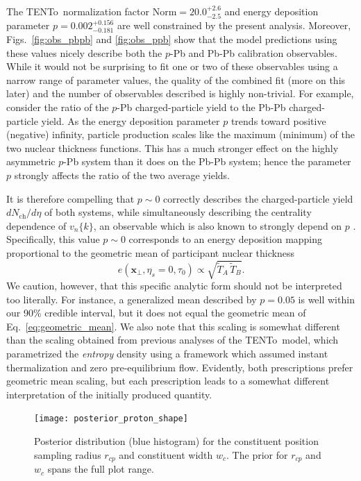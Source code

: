 \documentclass[aps,prc,reprint,amsmath,nofootinbib]{revtex4-1}
\newcommand{\trento}{T\raisebox{-0.5ex}{R}ENTo}
\newcommand{\nch}{N_\text{ch}}
\newcommand{\vnk}[2]{v_#1\{#2\}}
\newcommand{\T}{\tilde{T}}
\newcommand{\rc}{r_{cp}}
\newcommand{\wc}{w_c}
\newcommand{\xv}{\mathbf x}
\begin{document}
The \trento\ normalization factor ${\text{Norm} = 20.0^{+2.6}_{-2.5}}$ and energy deposition parameter $p=0.002^{+0.156}_{-0.181}$ are well constrained by the present analysis.
Moreover, Figs.~\ref{fig:obs_pbpb} and \ref{fig:obs_ppb} show that the model predictions using these values nicely describe both the $p$-Pb and Pb-Pb calibration observables.
While it would not be surprising to fit one or two of these observables using a narrow range of parameter values, the quality of the combined fit (more on this later) and the number of observables described is highly non-trivial.
For example, consider the ratio of the $p$-Pb charged-particle yield to the Pb-Pb charged-particle yield.
As the energy deposition parameter $p$ trends toward positive (negative) infinity, particle production scales like the maximum (minimum) of the two nuclear thickness functions.
This has a much stronger effect on the highly asymmetric $p$-Pb system than it does on the Pb-Pb system; hence the parameter $p$ strongly affects the ratio of the two average yields.

It is therefore compelling that $p \sim 0$ correctly describes the charged-particle yield $d\nch/d\eta$ of both systems, while simultaneously describing the centrality dependence of $\vnk{n}{k}$, an observable which is also known to strongly depend on $p$ \cite{Bernhard:2018hnz}.
Specifically, this value $p \sim 0$ corresponds to an energy deposition mapping proportional to the geometric mean of participant nuclear thickness
\begin{equation}
  \label{eq:geometric_mean}
  e(\xv_\perp, \eta_s=0, \tau_0) \propto \sqrt{\T_A\, \T_B}.
\end{equation}
We caution, however, that this specific analytic form should not be interpreted too literally.
For instance, a generalized mean described by $p=0.05$ is well within our 90\% credible interval, but it does not equal the geometric mean of Eq.~\eqref{eq:geometric_mean}.
We also note that this scaling is somewhat different than the scaling obtained from previous analyses of the \trento\ model, which parametrized the \emph{entropy} density using a framework which assumed instant thermalization and zero pre-equilibrium flow.
Evidently, both prescriptions prefer geometric mean scaling, but each prescription leads to a somewhat different interpretation of the initially produced quantity.

\begin{figure}
  \texttt{[image: posterior\_proton\_shape]}
  \caption{
    \label{fig:posterior_proton_shape}
    Posterior distribution (blue histogram) for the constituent position sampling radius $\rc$ and constituent width $\wc$.
    The prior for $\rc$ and $\wc$ spans the full plot range.
  }
\end{figure}
\end{document}
